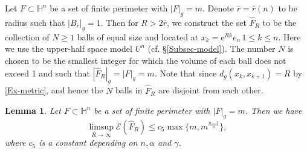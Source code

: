 \documentclass[11pt,reqno]{amsart}
\newtheorem{lem}[thm]{Lemma}
\theoremstyle{definition}
\theoremstyle{remark}
\numberwithin{equation}{section}
\renewcommand{\(}{\left(}
\renewcommand{\)}{\right)}
\renewcommand{\-}{\overline}
\begin{document}
Let $F\subset\mathbb{H}^n$ be a set of finite perimeter with $|F|_g=m$. Denote $\bar{r}=\bar{r}(n)$ to be radius such that $|B_{\bar{r}}|_g=1$. Then for $R>2\bar{r}$, we construct the set $\widehat{F}_R$ to be the collection of $N\geq 1$ balls of equal size and located at $x_k=\mathrm{e}^{Rk}e_n\,1\leq k\leq n$. Here we use the upper-half space model $U^n$ (cf. \S\ref{Subsec-model}). The number $N$ is chosen to be the smallest integer for which the volume of each ball does not exceed 1 and such that $|\widehat{F}_R|_g=|F|_g=m$. Note that since $d_g(x_k,x_{k+1})=R$ by \eqref{Ex-metric}, and hence the $N$ balls in $\widehat{F}_R$ are disjoint from each other. 
\begin{lem}\label{Lem-ER}
	Let $F\subset\mathbb{H}^n$ be a set of finite perimeter with $|F|_g=m$. Then we have
 \begin{equation}\label{Eq-ER}
	\limsup_{R\to\infty}\mathcal{E}({\widehat{F}_R})\leq c_5\max\{m,m^{\frac{n-1}{n}}\},
\end{equation} 
where $c_5$ is a constant depending on $n, \alpha$ and $\gamma$.
\end{lem}
\end{document}
